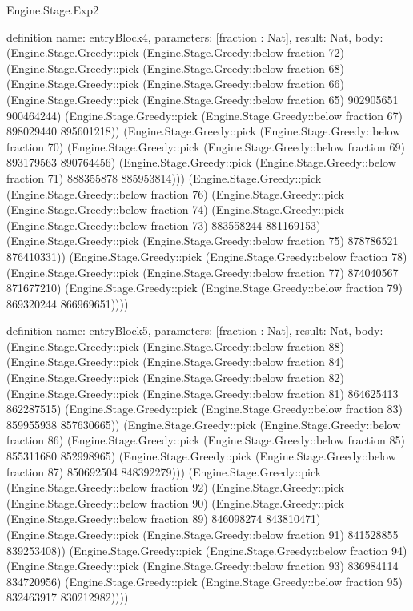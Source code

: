 \begin{lexlean}{Engine.Stage.Exp2}
\begin{semanticmodule}
definition{
  name: entryBlock4,
  parameters: [fraction : Nat],
  result: Nat,
  body: (Engine.Stage.Greedy::pick (Engine.Stage.Greedy::below fraction 72) (Engine.Stage.Greedy::pick (Engine.Stage.Greedy::below fraction 68) (Engine.Stage.Greedy::pick (Engine.Stage.Greedy::below fraction 66) (Engine.Stage.Greedy::pick (Engine.Stage.Greedy::below fraction 65) 902905651 900464244) (Engine.Stage.Greedy::pick (Engine.Stage.Greedy::below fraction 67) 898029440 895601218)) (Engine.Stage.Greedy::pick (Engine.Stage.Greedy::below fraction 70) (Engine.Stage.Greedy::pick (Engine.Stage.Greedy::below fraction 69) 893179563 890764456) (Engine.Stage.Greedy::pick (Engine.Stage.Greedy::below fraction 71) 888355878 885953814))) (Engine.Stage.Greedy::pick (Engine.Stage.Greedy::below fraction 76) (Engine.Stage.Greedy::pick (Engine.Stage.Greedy::below fraction 74) (Engine.Stage.Greedy::pick (Engine.Stage.Greedy::below fraction 73) 883558244 881169153) (Engine.Stage.Greedy::pick (Engine.Stage.Greedy::below fraction 75) 878786521 876410331)) (Engine.Stage.Greedy::pick (Engine.Stage.Greedy::below fraction 78) (Engine.Stage.Greedy::pick (Engine.Stage.Greedy::below fraction 77) 874040567 871677210) (Engine.Stage.Greedy::pick (Engine.Stage.Greedy::below fraction 79) 869320244 866969651))))
}

definition{
  name: entryBlock5,
  parameters: [fraction : Nat],
  result: Nat,
  body: (Engine.Stage.Greedy::pick (Engine.Stage.Greedy::below fraction 88) (Engine.Stage.Greedy::pick (Engine.Stage.Greedy::below fraction 84) (Engine.Stage.Greedy::pick (Engine.Stage.Greedy::below fraction 82) (Engine.Stage.Greedy::pick (Engine.Stage.Greedy::below fraction 81) 864625413 862287515) (Engine.Stage.Greedy::pick (Engine.Stage.Greedy::below fraction 83) 859955938 857630665)) (Engine.Stage.Greedy::pick (Engine.Stage.Greedy::below fraction 86) (Engine.Stage.Greedy::pick (Engine.Stage.Greedy::below fraction 85) 855311680 852998965) (Engine.Stage.Greedy::pick (Engine.Stage.Greedy::below fraction 87) 850692504 848392279))) (Engine.Stage.Greedy::pick (Engine.Stage.Greedy::below fraction 92) (Engine.Stage.Greedy::pick (Engine.Stage.Greedy::below fraction 90) (Engine.Stage.Greedy::pick (Engine.Stage.Greedy::below fraction 89) 846098274 843810471) (Engine.Stage.Greedy::pick (Engine.Stage.Greedy::below fraction 91) 841528855 839253408)) (Engine.Stage.Greedy::pick (Engine.Stage.Greedy::below fraction 94) (Engine.Stage.Greedy::pick (Engine.Stage.Greedy::below fraction 93) 836984114 834720956) (Engine.Stage.Greedy::pick (Engine.Stage.Greedy::below fraction 95) 832463917 830212982))))
}


\end{semanticmodule}
\end{lexlean}
